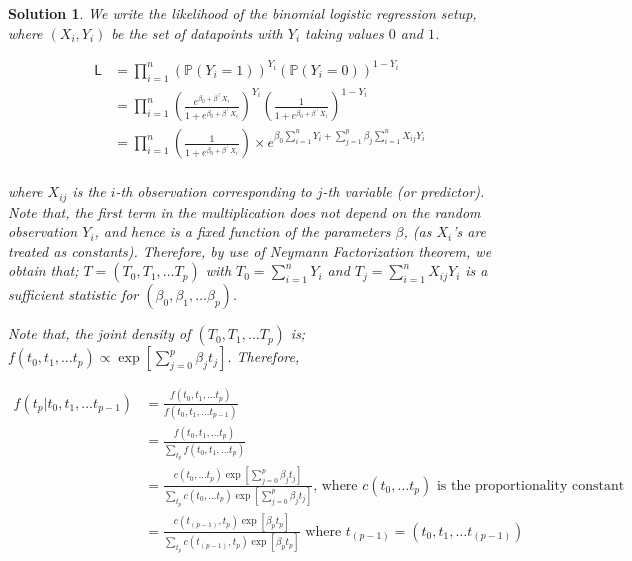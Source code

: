 \documentclass[12pt]{article}
\theoremstyle{problemstyle}
\newtheorem*{solution*}{Solution}
\def\Pr{\mathbb{P}}
\begin{document}
\begin{solution*}

We write the likelihood of the binomial logistic regression setup, where $(X_i, Y_i)$ be the set of datapoints with $Y_i$ taking values $0$ and $1$. 

\begin{align*}
	\mathsf{L} & = \prod_{i=1}^{n} \left( \Pr(Y_i = 1) \right)^{Y_i} \left( \Pr(Y_i = 0) \right)^{1 - Y_i}\\
	& = \prod_{i=1}^{n} \left( \frac{e^{\beta_0 + \beta^\intercal X_i}}{1 + e^{\beta_0 + \beta^\intercal X_i}} \right)^{Y_i} \left( \frac{1}{1 + e^{\beta_0 + \beta^\intercal X_i}} \right)^{1 - Y_i}\\
	& = \prod_{i=1}^{n}\left(\frac{1}{1 + e^{\beta_0 + \beta^\intercal X_i}}\right) \times e^{\beta_0\sum_{i=1}^{n}Y_i + \sum_{j=1}^{p} \beta_j \sum_{i=1}^{n}X_{ij}Y_i}\\	
\end{align*}

where $X_{ij}$ is the $i$-th observation corresponding to $j$-th variable (or predictor). Note that, the first term in the multiplication does not depend on the random observation $Y_i$, and hence is a fixed function of the parameters $\beta$, (as $X_i$'s are treated as constants). Therefore, by use of Neymann Factorization theorem, we obtain that; $T = (T_0, T_1, \dots T_p)$ with $T_0 = \sum_{i=1}^{n}Y_i$ and $T_j = \sum_{i=1}^{n}X_{ij}Y_i$ is a sufficient statistic for $\left(\beta_0, \beta_1, \dots \beta_p\right)$. 

Note that, the joint density of $(T_0, T_1, \dots T_p)$ is; $f(t_0, t_1, \dots t_p) \propto \exp\left[ \sum_{j=0}^{p} \beta_jt_j\right]$. Therefore,

\begin{align*}
	f(t_p\vert  t_0, t_1, \dots t_{p-1}) & = \frac{f(t_0, t_1, \dots t_p)}{f(t_0, t_1, \dots t_{p-1})}\\
	& = \frac{f(t_0, t_1, \dots t_p)}{\sum_{t_p} f(t_0, t_1, \dots t_p)}\\
	& = \frac{c(t_0, \dots t_p)\exp\left[ \sum_{j=0}^{p} \beta_jt_j\right]}{\sum_{t_p} c(t_0, \dots t_p) \exp\left[ \sum_{j=0}^{p} \beta_jt_j\right]} \text{, where } c(t_0, \dots t_p) \text{ is the proportionality constant}\\
	& = \frac{c(t_{(p-1)}, t_p)\exp\left[\beta_pt_p\right]}{\sum_{t_p} c(t_{(p-1)}, t_p)\exp\left[\beta_pt_p\right]} \text{ where } t_{(p-1)} = (t_0, t_1, \dots t_{(p-1)})
\end{align*}


\end{solution*}
\end{document}
